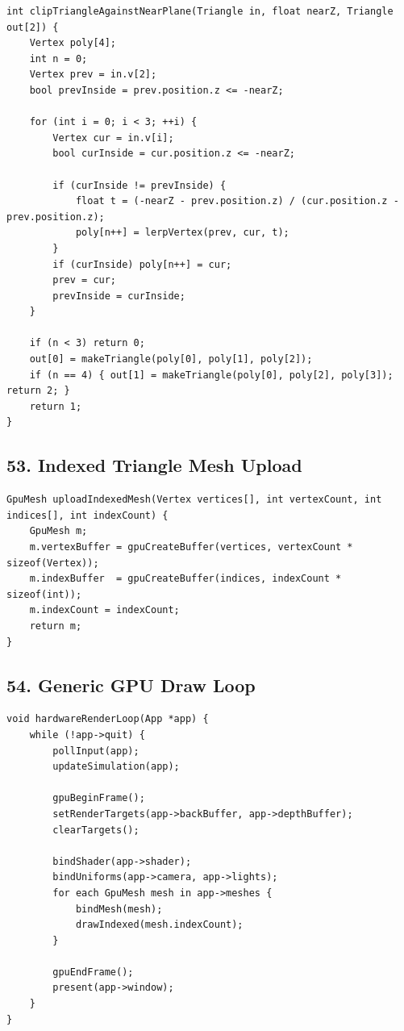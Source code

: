 \documentclass[10pt,letterpaper]{article}
\begin{document}
\begin{verbatim}
int clipTriangleAgainstNearPlane(Triangle in, float nearZ, Triangle out[2]) {
    Vertex poly[4];
    int n = 0;
    Vertex prev = in.v[2];
    bool prevInside = prev.position.z <= -nearZ;

    for (int i = 0; i < 3; ++i) {
        Vertex cur = in.v[i];
        bool curInside = cur.position.z <= -nearZ;

        if (curInside != prevInside) {
            float t = (-nearZ - prev.position.z) / (cur.position.z - prev.position.z);
            poly[n++] = lerpVertex(prev, cur, t);
        }
        if (curInside) poly[n++] = cur;
        prev = cur;
        prevInside = curInside;
    }

    if (n < 3) return 0;
    out[0] = makeTriangle(poly[0], poly[1], poly[2]);
    if (n == 4) { out[1] = makeTriangle(poly[0], poly[2], poly[3]); return 2; }
    return 1;
}
\end{verbatim}

\subsection{53. Indexed Triangle Mesh Upload}

\begin{verbatim}
GpuMesh uploadIndexedMesh(Vertex vertices[], int vertexCount, int indices[], int indexCount) {
    GpuMesh m;
    m.vertexBuffer = gpuCreateBuffer(vertices, vertexCount * sizeof(Vertex));
    m.indexBuffer  = gpuCreateBuffer(indices, indexCount * sizeof(int));
    m.indexCount = indexCount;
    return m;
}
\end{verbatim}

\subsection{54. Generic GPU Draw Loop}

\begin{verbatim}
void hardwareRenderLoop(App *app) {
    while (!app->quit) {
        pollInput(app);
        updateSimulation(app);

        gpuBeginFrame();
        setRenderTargets(app->backBuffer, app->depthBuffer);
        clearTargets();

        bindShader(app->shader);
        bindUniforms(app->camera, app->lights);
        for each GpuMesh mesh in app->meshes {
            bindMesh(mesh);
            drawIndexed(mesh.indexCount);
        }

        gpuEndFrame();
        present(app->window);
    }
}
\end{verbatim}
\end{document}
